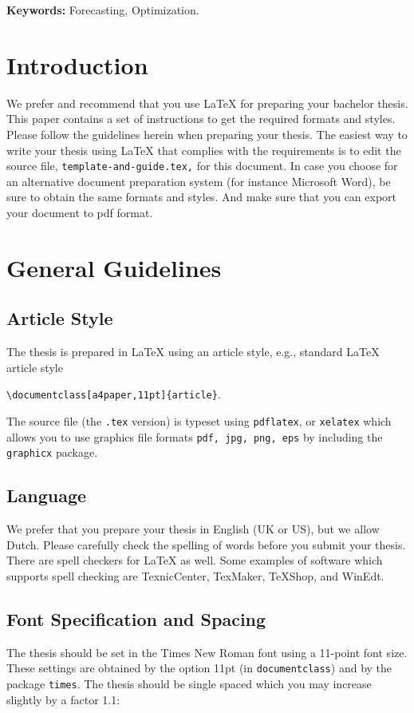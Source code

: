 \documentclass[a4paper,11pt]{article}
\theoremstyle{plain}
\theoremstyle{definition}
\begin{document}
\bigskip\noindent
\textbf{Keywords:} Forecasting, Optimization.

\section{Introduction}\label{s:intro}
We prefer and recommend that you use LaTeX for preparing your
bachelor thesis.
This paper contains a set of instructions to get the required formats and styles.
Please follow the guidelines herein when preparing your thesis.
The easiest way to write your thesis using LaTeX that complies with the
requirements is to edit the source file, \texttt{template-and-guide.tex,}
for this document. In case you choose for an alternative document preparation system
(for instance Microsoft Word), be sure to obtain the same formats and styles.
And make sure that you can export your document to pdf format.

\section{General Guidelines}\label{s:general}
\subsection{Article Style}
The thesis is prepared in LaTeX using an article style, e.g., standard
LaTeX article style

\verb+\documentclass[a4paper,11pt]{article}+.

\noindent
The source file (the \texttt{.tex} version) is typeset using \texttt{pdflatex},
or \texttt{xelatex} which allows you to use graphics file formats 
\texttt{pdf, jpg, png, eps}
by including the \texttt{graphicx} package.

\subsection{Language}
We prefer that you prepare your thesis in English (UK or US), but we allow Dutch.
Please carefully check the spelling of words before you submit your thesis.
There are spell checkers for LaTeX as well.
Some examples of software which supports spell checking are
TexnicCenter, TexMaker, TeXShop, and WinEdt.

\subsection{Font Specification and Spacing}
The thesis should be set in the Times New Roman font using a 11-point font size.
These settings are obtained by the option 11pt (in \texttt{documentclass})
and by the package \texttt{times}.
The thesis should be single spaced which you may increase slightly by a factor 1.1:
\end{document}
